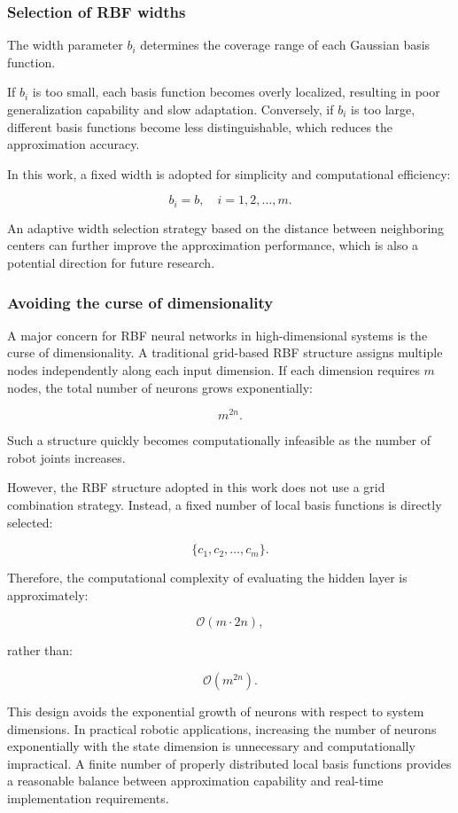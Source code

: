 \subsubsection{Selection of RBF widths}

The width parameter $b_i$ determines the coverage range of each Gaussian basis function.

If $b_i$ is too small, each basis function becomes overly localized, resulting in poor generalization capability and slow adaptation. Conversely, if $b_i$ is too large, different basis functions become less distinguishable, which reduces the approximation accuracy.

In this work, a fixed width is adopted for simplicity and computational efficiency:

\[
b_i=b,\quad i=1,2,\dots,m .
\]

An adaptive width selection strategy based on the distance between neighboring centers can further improve the approximation performance, which is also a potential direction for future research.


\subsubsection{Avoiding the curse of dimensionality}

A major concern for RBF neural networks in high-dimensional systems is the curse of dimensionality. A traditional grid-based RBF structure assigns multiple nodes independently along each input dimension. If each dimension requires $m$ nodes, the total number of neurons grows exponentially:

\[
m^{2n}.
\]

Such a structure quickly becomes computationally infeasible as the number of robot joints increases.

However, the RBF structure adopted in this work does not use a grid combination strategy. Instead, a fixed number of local basis functions is directly selected:

\[
\{c_1,c_2,\dots,c_m\}.
\]

Therefore, the computational complexity of evaluating the hidden layer is approximately:

\[
\mathcal{O}(m\cdot2n),
\]

rather than:

\[
\mathcal{O}(m^{2n}).
\]

This design avoids the exponential growth of neurons with respect to system dimensions. In practical robotic applications, increasing the number of neurons exponentially with the state dimension is unnecessary and computationally impractical. A finite number of properly distributed local basis functions provides a reasonable balance between approximation capability and real-time implementation requirements.


